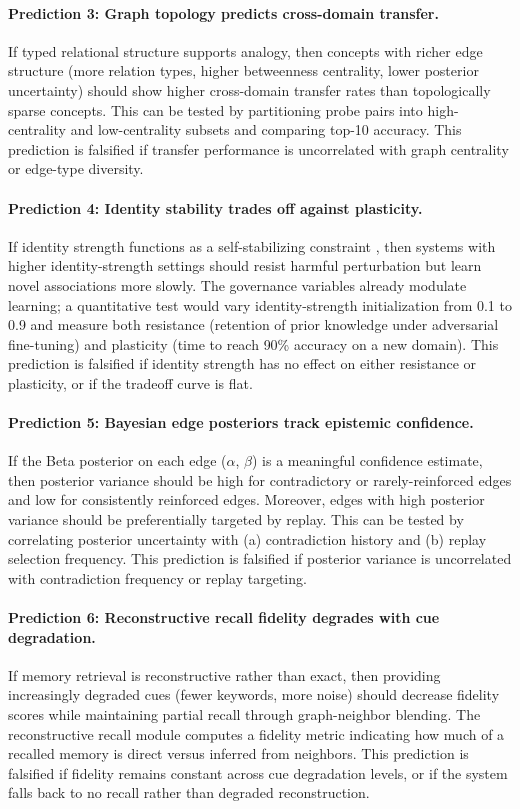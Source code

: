 \documentclass[11pt]{article}
\begin{document}
\paragraph{Prediction 3: Graph topology predicts cross-domain transfer.}
If typed relational structure supports analogy, then concepts with richer edge structure (more relation types, higher betweenness centrality, lower posterior uncertainty) should show higher cross-domain transfer rates than topologically sparse concepts. This can be tested by partitioning probe pairs into high-centrality and low-centrality subsets and comparing top-10 accuracy. This prediction is falsified if transfer performance is uncorrelated with graph centrality or edge-type diversity.

\paragraph{Prediction 4: Identity stability trades off against plasticity.}
If identity strength functions as a self-stabilizing constraint \cite{grossberg1980}, then systems with higher identity-strength settings should resist harmful perturbation but learn novel associations more slowly. The governance variables already modulate learning; a quantitative test would vary identity-strength initialization from 0.1 to 0.9 and measure both resistance (retention of prior knowledge under adversarial fine-tuning) and plasticity (time to reach 90\% accuracy on a new domain). This prediction is falsified if identity strength has no effect on either resistance or plasticity, or if the tradeoff curve is flat.

\paragraph{Prediction 5: Bayesian edge posteriors track epistemic confidence.}
If the Beta posterior on each edge ($\alpha$, $\beta$) is a meaningful confidence estimate, then posterior variance should be high for contradictory or rarely-reinforced edges and low for consistently reinforced edges. Moreover, edges with high posterior variance should be preferentially targeted by replay. This can be tested by correlating posterior uncertainty with (a) contradiction history and (b) replay selection frequency. This prediction is falsified if posterior variance is uncorrelated with contradiction frequency or replay targeting.

\paragraph{Prediction 6: Reconstructive recall fidelity degrades with cue degradation.}
If memory retrieval is reconstructive rather than exact, then providing increasingly degraded cues (fewer keywords, more noise) should decrease fidelity scores while maintaining partial recall through graph-neighbor blending. The reconstructive recall module computes a fidelity metric indicating how much of a recalled memory is direct versus inferred from neighbors. This prediction is falsified if fidelity remains constant across cue degradation levels, or if the system falls back to no recall rather than degraded reconstruction.
\end{document}
